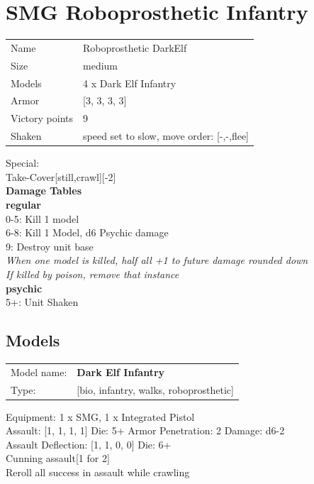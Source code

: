 \clearpage

\section{ SMG Roboprosthetic Infantry }

\begin{tabular}{ll}
  Name & Roboprosthetic DarkElf \\
  Size & medium\\
  Models & 4 x Dark Elf Infantry\\
  Armor & [3, 3, 3, 3]\\
  Victory points & 9\\
  Shaken & speed set to slow, move order: [-,-,flee]\\
\end{tabular}

Special:\\
Take-Cover[still,crawl][-2]\\ 



{\bf Damage Tables} \\
 {\bf regular } \\
0-5: Kill 1 model \\
6-8: Kill 1 Model, d6 Psychic damage \\
9: Destroy unit base \\
{{\it When one model is killed, half all +1 to future damage rounded down}} \\
{{\it If killed by poison, remove that instance}} \\
 {\bf psychic } \\
5+: Unit Shaken \\


\clearpage

\subsection{ Models }

\begin{tabular}{ll}
Model name: & {\bf Dark Elf Infantry } \\
Type: & [bio, infantry, walks, roboprosthetic] \\
\end{tabular}

Equipment: 1 x SMG, 1 x Integrated Pistol \\

Assault: [1, 1, 1, 1] Die: 5+ Armor Penetration: 2 Damage: d6-2 \\
Assault Deflection: [1, 1, 0, 0] Die: 6+\\
\indent Cunning assault[1 for 2]\\ 
Reroll all success in assault while crawling\\ 
 



